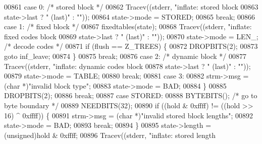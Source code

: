 \begin{DoxyCode}
{{{{00861             \textcolor{keywordflow}{case} 0:                             \textcolor{comment}{/* stored block */}
00862                 Tracev((stderr, \textcolor{stringliteral}{"inflate:     stored block%
00863                         state->last ? \textcolor{stringliteral}{" (last)"} : \textcolor{stringliteral}{""}));
00864                 state->mode = STORED;
00865                 \textcolor{keywordflow}{break};
00866             \textcolor{keywordflow}{case} 1:                             \textcolor{comment}{/* fixed block */}
00867                 fixedtables(state);
00868                 Tracev((stderr, \textcolor{stringliteral}{"inflate:     fixed codes block%
00869                         state->last ? \textcolor{stringliteral}{" (last)"} : \textcolor{stringliteral}{""}));
00870                 state->mode = LEN\_;             \textcolor{comment}{/* decode codes */}
00871                 \textcolor{keywordflow}{if} (flush == Z\_TREES) \{
00872                     DROPBITS(2);
00873                     \textcolor{keywordflow}{goto} inf\_leave;
00874                 \}
00875                 \textcolor{keywordflow}{break};
00876             \textcolor{keywordflow}{case} 2:                             \textcolor{comment}{/* dynamic block */}
00877                 Tracev((stderr, \textcolor{stringliteral}{"inflate:     dynamic codes block%
00878                         state->last ? \textcolor{stringliteral}{" (last)"} : \textcolor{stringliteral}{""}));
00879                 state->mode = TABLE;
00880                 \textcolor{keywordflow}{break};
00881             \textcolor{keywordflow}{case} 3:
00882                 strm->msg = (\textcolor{keywordtype}{char} *)\textcolor{stringliteral}{"invalid block type"};
00883                 state->mode = BAD;
00884             \}
00885             DROPBITS(2);
00886             \textcolor{keywordflow}{break};
00887         \textcolor{keywordflow}{case} STORED:
00888             BYTEBITS();                         \textcolor{comment}{/* go to byte boundary */}
00889             NEEDBITS(32);
00890             \textcolor{keywordflow}{if} ((hold & 0xffff) != ((hold >> 16) ^ 0xffff)) \{
00891                 strm->msg = (\textcolor{keywordtype}{char} *)\textcolor{stringliteral}{"invalid stored block lengths"};
00892                 state->mode = BAD;
00893                 \textcolor{keywordflow}{break};
00894             \}
00895             state->length = (unsigned)hold & 0xffff;
00896             Tracev((stderr, \textcolor{stringliteral}{"inflate:       stored length %
}}}}}}}}
\end{DoxyCode}
